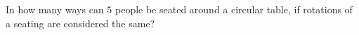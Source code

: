 In how many ways can $5$ people be seated around a circular table, if rotations of a seating are considered the same?
